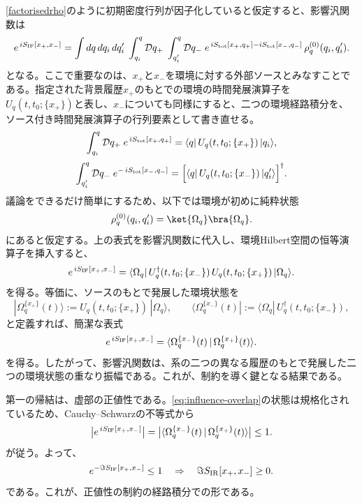 \documentclass[a4paper,11pt,oneside]{article}
\theoremstyle{definition}
\numberwithin{equation}{section}
\newcommand{\then}{\quad \Rightarrow\quad}
\begin{document}
\eqref{factorisedrho}のように初期密度行列が因子化していると仮定すると、影響汎関数は
\begin{equation}
e^{\,iS_{\rm IF}[x_+,x_-]}
=
\int dq\,dq_i\,dq_i'\;
\int_{q_i}^{q}\mathcal D q_+\;
\int_{q_i'}^{q}\mathcal D q_-\;
e^{\,iS_{\rm tot}[x_+,q_+] - iS_{\rm tot}[x_-,q_-]}\,
\rho_q^{(0)}(q_i,q_i') .
\end{equation}
となる。ここで重要なのは、\(x_+\)と\(x_-\)を環境に対する外部ソースとみなすことである。指定された背景履歴\(x_+\)のもとでの環境の時間発展演算子を\(U_q(t,t_0;\{x_+\})\)と表し、\(x_-\)についても同様にすると、二つの環境経路積分を、ソース付き時間発展演算子の行列要素として書き直せる。
\begin{equation}
\int_{q_i}^{q}\mathcal D q_+\; e^{\,iS_{\rm tot}[x_+,q_+]}
=
\langle q|\,U_q(t,t_0;\{x_+\})\,|q_i\rangle ,
\end{equation}
\begin{equation}
\int_{q_i'}^{q}\mathcal D q_-\; e^{-\,iS_{\rm tot}[x_-,q_-]}
=
\Bigl[\langle q|\,U_q(t,t_0;\{x_-\})\,|q_i'\rangle\Bigr]^\dagger .
\end{equation}
議論をできるだけ簡単にするため、以下では環境が初めに純粋状態
\[   \rho_q^{(0)}(q_i,q_i') =  \ket{\Omega_q}\bra{\Omega_q}. \]
にあると仮定する。上の表式を影響汎関数に代入し、環境Hilbert空間の恒等演算子を挿入すると、
\begin{equation}
e^{\,iS_{\rm IF}[x_+,x_-]}
=
\langle \Omega_q|\,
U_q^\dagger(t,t_0;\{x_-\})\,
U_q(t,t_0;\{x_+\})\,
|\Omega_q\rangle .
\end{equation}
を得る。等価に、ソースのもとで発展した環境状態を
\begin{equation}
|\Omega_q^{\{x_+\}}(t)\rangle
:=
U_q(t,t_0;\{x_+\})\,|\Omega_q\rangle ,
\qquad
\langle \Omega_q^{\{x_-\}}(t)|
:=
\langle\Omega_q|\,U_q^\dagger(t,t_0;\{x_-\}) ,
\end{equation}
と定義すれば、簡潔な表式
\begin{equation}\label{eq:influence-overlap}
e^{\,iS_{\rm IF}[x_+,x_-]}
=
\langle \Omega_q^{\{x_-\}}(t)\,|\,\Omega_q^{\{x_+\}}(t)\rangle .
\end{equation}
を得る。したがって、影響汎関数は、系の二つの異なる履歴のもとで発展した二つの環境状態の重なり振幅である。これが、制約を導く鍵となる結果である。



第一の帰結は、虚部の正値性である。\eqref{eq:influence-overlap}の状態は規格化されているため、Cauchy--Schwarzの不等式から
\begin{equation}
\bigl|e^{\,iS_{\rm IF}[x_+,x_-]}\bigr|
=
\bigl|\langle \Omega_q^{\{x_-\}}(t)\,|\,\Omega_q^{\{x_+\}}(t)\rangle\bigr|
\le 1 .
\end{equation}
が従う。よって、
\begin{equation}
e^{-\Im S_{\rm IF}[x_+,x_-]} \le 1  \then 
\Im S_{\rm IR}[x_+,x_-] \ge 0 .
\end{equation}
である。これが、正値性の制約の経路積分での形である。
\end{document}
